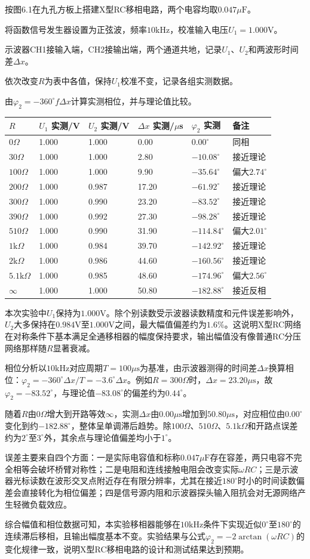 \documentclass{eleclab-report}
\makeatletter
\newcommand{\ExpSixSmallTableFont}{\ElecLabBodyFont\fontsize{8.5pt}{11.5pt}\selectfont}
\newcommand{\ExpSixSmallTable}[1]{%
  \begingroup
  \setlength{\tabcolsep}{2.0pt}%
  \renewcommand{\arraystretch}{1.18}%
  \begin{center}
  {\ExpSixSmallTableFont #1}
  \end{center}
  \endgroup
}
\newcommand{\AnalysisParagraph}[1]{\par\hspace*{2em}#1\par}
\newcommand{\MeasurementTable}{%
  \begin{tabularx}{\linewidth}{@{}Y{0.70}Y{0.86}Y{0.86}Y{0.98}Y{0.98}Y{1.62}@{}}
    \toprule
    $R$ & \makecell[c]{$U_1$\\实测/V} & \makecell[c]{$U_2$\\实测/V} &
    \makecell[c]{$\Delta x$\\实测/$\mu$s} & \makecell[c]{$\varphi_2$\\实测} & 备注 \\
    \midrule
    $0\Omega$ & 1.000 & 1.000 & 0.00 & $0.00^\circ$ & 同相 \\
    $30\Omega$ & 1.000 & 1.000 & 2.80 & $-10.08^\circ$ & 接近理论 \\
    $100\Omega$ & 1.000 & 1.000 & 9.90 & $-35.64^\circ$ & 偏大$2.74^\circ$ \\
    $200\Omega$ & 1.000 & 0.987 & 17.20 & $-61.92^\circ$ & 接近理论 \\
    $300\Omega$ & 1.000 & 0.990 & 23.20 & $-83.52^\circ$ & 接近理论 \\
    $390\Omega$ & 1.000 & 0.992 & 27.30 & $-98.28^\circ$ & 接近理论 \\
    $510\Omega$ & 1.000 & 0.990 & 31.90 & $-114.84^\circ$ & 偏大$2.01^\circ$ \\
    $1\mathrm{k}\Omega$ & 1.000 & 0.984 & 39.70 & $-142.92^\circ$ & 接近理论 \\
    $2\mathrm{k}\Omega$ & 1.000 & 0.986 & 44.60 & $-160.56^\circ$ & 接近理论 \\
    $5.1\mathrm{k}\Omega$ & 1.000 & 0.985 & 48.60 & $-174.96^\circ$ & 偏大$2.56^\circ$ \\
    $\infty$ & 1.000 & 1.000 & 50.80 & $-182.88^\circ$ & 接近反相 \\
    \bottomrule
  \end{tabularx}%
}
\makeatother
\begin{document}
\begin{LabArabicList}
  \item 按图6.1在九孔方板上搭建X型RC移相电路，两个电容均取$0.047\mu\mathrm{F}$。
  \item 将函数信号发生器设置为正弦波，频率$10\mathrm{kHz}$，校准输入电压$U_1=1.000\mathrm{V}$。
  \item 示波器CH1接输入端，CH2接输出端，两个通道共地，记录$U_1$、$U_2$和两波形时间差$\Delta x$。
  \item 依次改变$R$为表中各值，保持$U_1$校准不变，记录各组实测数据。
  \item 由$\varphi_2=-360^\circ f\Delta x$计算实测相位，并与理论值比较。
\end{LabArabicList}

\ExpSixSmallTable{\MeasurementTable}

\AnalysisParagraph{本次实验中$U_1$保持为$1.000\mathrm{V}$。除个别读数受示波器读数精度和元件误差影响外，$U_2$大多保持在$0.984\mathrm{V}$至$1.000\mathrm{V}$之间，最大幅值偏差约为$1.6\%$。这说明X型RC网络在对称条件下基本满足全通移相器的幅度保持要求，输出幅值没有像普通RC分压网络那样随$R$显著衰减。}
\AnalysisParagraph{相位分析以$10\mathrm{kHz}$对应周期$T=100\mu\mathrm{s}$为基准，由示波器测得的时间差$\Delta x$换算相位：$\varphi_2=-360^\circ\Delta x/T=-3.6^\circ\Delta x$。例如$R=300\Omega$时，$\Delta x=23.20\mu\mathrm{s}$，故$\varphi_2=-83.52^\circ$，与理论值$-83.08^\circ$的偏差约为$0.44^\circ$。}
\AnalysisParagraph{随着$R$由$0\Omega$增大到开路等效$\infty$，实测$\Delta x$由$0.00\mu\mathrm{s}$增加到$50.80\mu\mathrm{s}$，对应相位由$0.00^\circ$变化到约$-182.88^\circ$，整体呈单调滞后趋势。除$100\Omega$、$510\Omega$、$5.1\mathrm{k}\Omega$和开路点误差约为$2^\circ$至$3^\circ$外，其余点与理论值偏差均小于$1^\circ$。}
\AnalysisParagraph{误差主要来自四个方面：一是实际电容值和标称$0.047\mu\mathrm{F}$存在容差，两只电容不完全相等会破坏桥臂对称性；二是电阻和连线接触电阻会改变实际$\omega RC$；三是示波器光标读数在波形交叉点附近存在有限分辨率，尤其在接近$180^\circ$时小的时间读数偏差会直接转化为相位偏差；四是信号源内阻和示波器探头输入阻抗会对无源网络产生轻微负载效应。}
\AnalysisParagraph{综合幅值和相位数据可知，本实验移相器能够在$10\mathrm{kHz}$条件下实现近似$0^\circ$至$180^\circ$的连续滞后移相，且输出幅度基本不变。实验结果与公式$\varphi_2=-2\arctan(\omega RC)$的变化规律一致，说明X型RC移相电路的设计和测试结果达到预期。}
\end{document}
